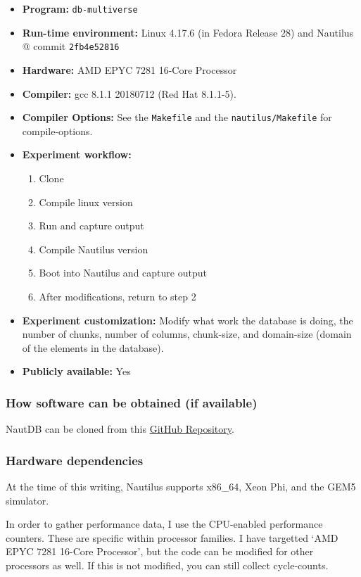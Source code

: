 \documentclass{IEEEtran}
\begin{document}
{\small
\begin{itemize}
  \item {\bf Program:} \verb+db-multiverse+
  \item {\bf Run-time environment:} Linux 4.17.6 (in Fedora Release 28) and Nautilus @ commit \texttt{2fb4e52816}
  \item {\bf Hardware:} AMD EPYC 7281 16-Core Processor
  \item {\bf Compiler:} gcc 8.1.1 20180712 (Red Hat 8.1.1-5).
  \item {\bf Compiler Options:} See the \texttt{Makefile} and the \texttt{nautilus/Makefile} for compile-options.
  \item {\bf Experiment workflow:}
    \begin{enumerate}
    \item Clone
    \item Compile linux version
    \item Run and capture output
    \item Compile Nautilus version
    \item Boot into Nautilus and capture output
    \item After modifications, return to step 2
    \end{enumerate}
  \item {\bf Experiment customization:} Modify what work the database is doing, the number of chunks, number of columns, chunk-size, and domain-size (domain of the elements in the database).
  \item {\bf Publicly available:} Yes
\end{itemize}
}

\subsubsection{How software can be obtained (if available)}

NautDB can be cloned from this \href{https://github.com/HExSA-Lab/db-multiverse/}{GitHub Repository}.

\subsubsection{Hardware dependencies}

At the time of this writing, Nautilus supports x86\_64, Xeon Phi, and the GEM5 simulator.

In order to gather performance data, I use the CPU-enabled performance counters. These are specific within processor families. I have targetted `AMD EPYC 7281 16-Core Processor', but the code can be modified for other processors as well. If this is not modified, you can still collect cycle-counts.
\end{document}
